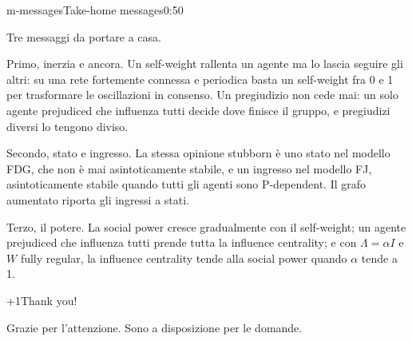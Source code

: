 \begin{slide}{m-messages}{Take-home messages}{0:50}
  \begin{discorso}
    \item Tre messaggi da portare a casa.
    \item Primo, inerzia e ancora. Un self-weight rallenta un agente ma lo lascia seguire gli altri: su una rete fortemente connessa e periodica basta un self-weight fra 0 e 1 per trasformare le oscillazioni in consenso. Un pregiudizio non cede mai: un solo agente prejudiced che influenza tutti decide dove finisce il gruppo, e pregiudizi diversi lo tengono diviso.
    \item Secondo, stato e ingresso. La stessa opinione stubborn è uno stato nel modello FDG, che non è mai asintoticamente stabile, e un ingresso nel modello FJ, asintoticamente stabile quando tutti gli agenti sono P-dependent. Il grafo aumentato riporta gli ingressi a stati.
    \item Terzo, il potere. La social power cresce gradualmente con il self-weight; un agente prejudiced che influenza tutti prende tutta la influence centrality; e con $\Lambda=\alpha I$ e $W$ fully regular, la influence centrality tende alla social power quando $\alpha$ tende a 1.
  \end{discorso}
\end{slide}

\begin{slidepag}{\the\numexpr{}+1\relax}{Thank you!}{}
  \begin{discorso}
    \item Grazie per l'attenzione. Sono a disposizione per le domande.
  \end{discorso}
\end{slidepag}


